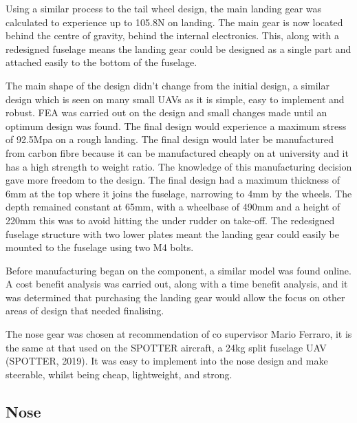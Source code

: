 \documentclass[../../main.tex]{subfiles}
\begin{document}
Using a similar process to the tail wheel design, the main landing gear was calculated to experience up to 105.8N on landing.
The main gear is now located behind the centre of gravity, behind the internal electronics.
This, along with a redesigned fuselage means the landing gear could be designed as a single part and attached easily to the bottom of the fuselage. 


The main shape of the design didn’t change from the initial design, a similar design which is seen on many small UAVs as it is simple, easy to implement and robust.
FEA was carried out on the design and small changes made until an optimum design was found.
The final design would experience a maximum stress of 92.5Mpa on a rough landing.
The final design would later be manufactured from carbon fibre because it can be manufactured cheaply on at university and it has a high strength to weight ratio.
The knowledge of this manufacturing decision gave more freedom to the design.
The final design had a maximum thickness of 6mm at the top where it joins the fuselage, narrowing to 4mm by the wheels.
The depth remained constant at 65mm, with a wheelbase of 490mm and a height of 220mm this was to avoid hitting the under rudder on take-off.
The redesigned fuselage structure with two lower plates meant the landing gear could easily be mounted to the fuselage using two M4 bolts. 

Before manufacturing began on the component, a similar model was found online. A cost benefit analysis was carried out, along with a time benefit analysis, and it was determined that purchasing the landing gear would allow the focus on other areas of design that needed finalising. 


The nose gear was chosen at recommendation of co supervisor Mario Ferraro, it is the same at that used on the SPOTTER aircraft, a 24kg split fuselage UAV (SPOTTER, 2019). It was easy to implement into the nose design and make steerable, whilst being cheap, lightweight, and strong. 

\subsection{Nose} \label{sec:design-process:final-design-proposal:nose}
\end{document}
